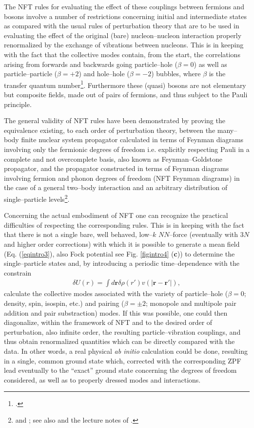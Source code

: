 The NFT rules  for evaluating the effect of these couplings between fermions and bosons involve a number of restrictions concerning initial and intermediate states as compared with the usual rules of perturbation theory that are to be used in evaluating the effect of the original (bare) nucleon--nucleon interaction properly renormalized by  the exchange of vibrations between nucleons. This is in keeping with the fact that the collective modes contain, from the start,  the correlations arising from forwards and backwards going  particle--hole ($\beta=0$) as well as particle--particle ($\beta=+2$) and hole--hole ($\beta=-2$) bubbles, where $\beta$ is the transfer quantum number\footnote{\cite{Bohr:64}.}. Furthermore  these (quasi) bosons are not elementary but composite fields, made out of pairs of fermions, and thus subject to the Pauli principle. 
 

The general validity of NFT rules have been demonstrated by proving the equivalence existing, to each order of perturbation theory, between the many--body finite nuclear system propagator calculated in terms of Feynman diagrams involving only the fermionic degrees of freedom i.e. explicitly respecting Pauli in a complete and not overcomplete basis, also known as Feynman--Goldstone propagator, and the propagator constructed in terms of Feynman diagrams involving fermion and phonon degrees of freedom (NFT Feynman diagrams) in the case of a general two--body interaction and an arbitrary distribution of single--particle levels\footnote{\cite{Bes:75} and \cite{Bes:76c}; see also \cite{Baranger:69} and the  lecture notes of  \cite{McFarlane:69}.}.



 Concerning the actual embodiment of NFT one can recognize the practical difficulties of respecting the corresponding rules. This is in keeping with the fact that there is not a single bare, well behaved, low--$k$ $NN$--force (eventually with 3$N$ and higher order corrections) with which it is possible to generate a mean field (Eq. (\ref{eqintro3}), also Fock potential see Fig. \ref{figintro4} (\textbf{c})) to determine the single--particle states and, by introducing a periodic time--dependence with the constrain
\begin{align}\label{eq1.5.1}
\delta U(r)=\int d\mathbf{r} \delta \rho(r') v(|\mathbf r- \mathbf r'|),
\end{align}
calculate the collective modes associated with the variety of particle--hole ($\beta=0$; density, spin, isospin, etc.) and pairing ($\beta=\pm2$; monopole and multipole pair addition and pair substraction) modes. If this was possible, one could then diagonalize, within the framework of NFT and to the desired order of perturbation, also infinite order, the resulting particle--vibration couplings, and thus obtain renormalized quantities which can be directly compared with the data.
 In other words, a real physical \textit{ab initio} calculation could be done, resulting in a single,  common ground state which, corrected with the corresponding  ZPF lead eventually to the ``exact'' ground state concerning the degrees of freedom considered, as well as to properly dressed modes and  interactions.



